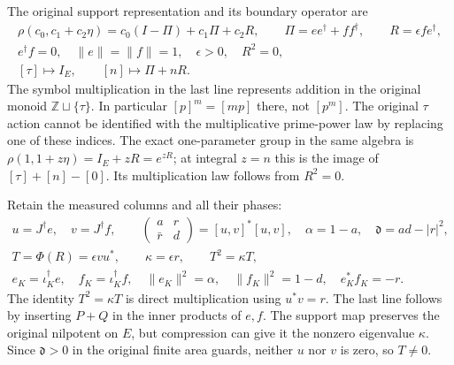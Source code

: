 The original support representation and its boundary operator are
\begin{equation}\tag{TDP11}
\begin{gathered}
\rho(c_0,c_1+c_2\eta)=c_0(I-\Pi)+c_1\Pi+c_2R,\qquad
\Pi=ee^\dagger+ff^\dagger,\qquad R=\epsilon fe^\dagger,\\
e^\dagger f=0,\quad \|e\|=\|f\|=1,\quad \epsilon>0,\quad R^2=0,\\
[\tau]\longmapsto I_E,\qquad [n]\longmapsto\Pi+nR.
\end{gathered}
\end{equation}
The symbol multiplication in the last line represents addition in the
original monoid $\mathbb Z\sqcup\{\tau\}$. In particular $[p]^m=[mp]$
there, not $[p^m]$. The original $\tau$ action cannot be identified with
the multiplicative prime-power law by replacing one of these indices.
The exact one-parameter group in the same algebra is
$\rho(1,1+z\eta)=I_E+zR=e^{zR}$; at integral $z=n$ this is the image
of $[\tau]+[n]-[0]$. Its multiplication law follows from $R^2=0$.

Retain the measured columns and all their phases:
\begin{equation}\tag{TDP12}
\begin{gathered}
u=J^\dagger e,\quad v=J^\dagger f,\qquad
\begin{pmatrix}a&r\\\bar r&d\end{pmatrix}
 =[u,v]^*[u,v],\quad \alpha=1-a,\quad \mathfrak d=ad-|r|^2,\\
T=\Phi(R)=\epsilon vu^*,\qquad \kappa=\epsilon r,\qquad
T^2=\kappa T,\\
e_K=\iota_K^\dagger e,\quad f_K=\iota_K^\dagger f,\quad
\|e_K\|^2=\alpha,\quad\|f_K\|^2=1-d,\quad e_K^*f_K=-r.
\end{gathered}
\end{equation}
The identity $T^2=\kappa T$ is direct multiplication using $u^*v=r$.
The last line follows by inserting $P+Q$ in the inner products of $e,f$.
The support map preserves the original nilpotent on $E$, but compression
can give it the nonzero eigenvalue $\kappa$. Since $\mathfrak d>0$ in
the original finite area guards, neither $u$ nor $v$ is zero, so $T\ne0$.

